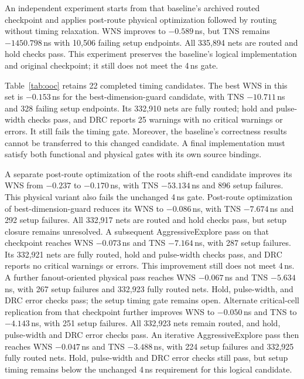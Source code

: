 \documentclass[conference,10pt]{IEEEtran}
\begin{document}
An independent experiment starts from that baseline's archived routed
checkpoint and applies post-route physical optimization followed by routing
without timing relaxation. WNS improves to $-0.589$\,ns, but TNS remains
$-1450.798$\,ns with 10,506 failing setup endpoints. All 335,894 nets are
routed and hold checks pass. This experiment preserves the baseline's
logical implementation and original checkpoint; it still does not meet the
4\,ns gate.

\begin{table}[t]
\centering\small
\setlength{\tabcolsep}{3pt}
\caption{Completed October 12--14 internal 4\,ns OOC experiments. Each row
is a separate candidate and all fail setup timing. WNS and TNS are in ns;
fails counts setup endpoints. Rows are diagnostic
experiments, not a controlled causal ablation.}
\label{tab:ooc}

\end{table}

Table~\ref{tab:ooc} retains 22 completed timing candidates. The best WNS in
this set is $-0.153$\,ns for the best-dimension-guard candidate, with TNS
$-10.711$\,ns and 328 failing setup endpoints. Its 332,910 nets are fully
routed; hold and pulse-width checks pass, and DRC reports 25 warnings with
no critical warnings or errors. It still fails the timing gate. Moreover,
the baseline's correctness results cannot be transferred to this changed
candidate. A final implementation must satisfy both functional and physical
gates with its own source bindings.

A separate post-route optimization of the roots shift-end candidate improves
its WNS from $-0.237$ to $-0.170$\,ns, with TNS $-53.134$\,ns and 896 setup
failures. This physical variant also fails the unchanged 4\,ns gate.
Post-route optimization of best-dimension-guard reduces its WNS to
$-0.086$\,ns, with TNS $-7.674$\,ns and 292 setup failures. All 332,917
nets are routed and hold checks pass, but setup closure remains unresolved.
A subsequent AggressiveExplore pass on that checkpoint reaches WNS
$-0.073$\,ns and TNS $-7.164$\,ns, with 287 setup failures. Its 332,921
nets are fully routed, hold and pulse-width checks pass, and DRC reports no
critical warnings or errors. This improvement still does not meet 4\,ns.
A further fanout-oriented physical pass reaches WNS $-0.067$\,ns and TNS
$-5.634$\,ns, with 267 setup failures and 332,923 fully routed nets. Hold,
pulse-width, and DRC error checks pass; the setup timing gate remains open.
Alternate critical-cell replication from that checkpoint further improves
WNS to $-0.050$\,ns and TNS to $-4.143$\,ns, with 251 setup failures.
All 332,923 nets remain routed, and hold, pulse-width and DRC error checks
pass. An iterative AggressiveExplore pass then reaches WNS $-0.047$\,ns
and TNS $-3.488$\,ns, with 224 setup failures and 332,925 fully routed
nets. Hold, pulse-width and DRC error checks still pass, but setup timing
remains below the unchanged 4\,ns requirement for this logical candidate.
\end{document}
